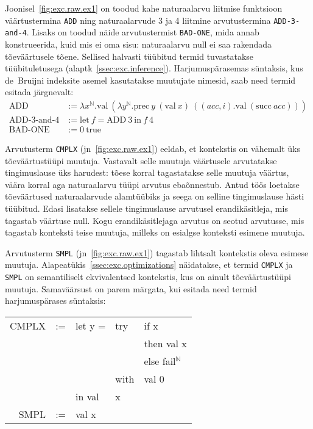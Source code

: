 \documentclass[a4paper,12pt]{article}
\begin{document}
Joonisel~\ref{fig:exc.raw.ex1} on toodud kahe naturaalarvu liitmise funktsioon väärtustermina {\tt ADD}
ning naturaalarvude 3 ja 4 liitmine arvutustermina {\tt ADD-3-and-4}.
Lisaks on toodud näide arvutustermist {\tt BAD-ONE}, mida annab konstrueerida,
kuid mis ei oma sisu: naturaalarvu null ei saa rakendada tõeväärtusele tõene.
Sellised halvasti tüübitud termid tuvastatakse tüübituletusega (alaptk~\ref{ssec:exc.inference}).
Harjumuspärasemas süntaksis, kus de~Bruijni indeksite asemel kasutatakse muutujate nimesid, saab need termid esitada järgnevalt:
\begin{equation*}
\begin{split}
  \text{ADD} &:= \lambda x^\mathbb{N}.\text{val}~(\lambda y^\mathbb{N}.\text{prec}~y~ (\text{val}~x)~((acc,i).\text{val}~(\text{succ}~acc)))\\
  \text{ADD-3-and-4} &:= \text{let}~f=\text{ADD}~3~\text{in}~f~4\\
  \text{BAD-ONE} &:= 0~\text{true}
\end{split}
\end{equation*}

Arvutusterm {\tt CMPLX} (jn~\ref{fig:exc.raw.ex1}) eeldab, et kontekstis on vähemalt üks tõeväärtustüüpi muutuja.
Vastavalt selle muutuja väärtusele arvutatakse tingimuslause üks harudest: tõese korral tagastatakse selle muutuja väärtus, väära korral aga naturaalarvu tüüpi arvutus ebaõnnestub.
Antud töös loetakse tõeväärtused naturaalarvude alamtüübiks ja seega on selline tingimuslause hästi tüübitud.
Edasi lisatakse sellele tingimuslause arvutusel erandikäsitleja, mis tagastab väärtuse null.
Kogu erandikäsitlejaga arvutus on seotud arvutusse, mis tagastab konteksti teise muutuja, milleks on esialgse konteksti esimene muutuja.

Arvutusterm {\tt SMPL} (jn~\ref{fig:exc.raw.ex1}) tagastab lihtsalt kontekstis oleva esimese muutuja.
Alapeatükis~\ref{ssec:exc.optimizations} näidatakse, et termid {\tt CMPLX} ja {\tt SMPL} on semantiliselt ekvivalentsed kontekstis, kus on ainult tõeväärtustüüpi muutuja.
Samaväärsust on parem märgata, kui esitada need termid harjumuspärases süntaksis:
\begin{center}
\begin{tabular}{ r c l l l }
  CMPLX & := & let y = & try &if x \\
        &    &         &    &then val x\\
        &    &         &    &else fail$^\mathbb{N}$\\
        &    &         & with& val 0\\
        &    & in val &x &\\
  SMPL  & := & val x   & &\\
\end{tabular}
\end{center}
\end{document}

